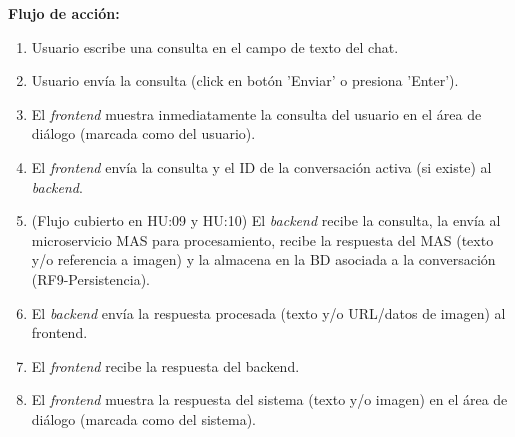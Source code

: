 \begin{userstory}[hu:08]
{		\textbf{Flujo de acción:}
		\begin{enumerate}
			\item Usuario escribe una consulta en el campo de texto del chat.
			\item Usuario envía la consulta (click en botón 'Enviar' o presiona 'Enter').
			\item El \textit{frontend} muestra inmediatamente la consulta del usuario en el área de diálogo (marcada como del usuario).
			\item El \textit{frontend} envía la consulta y el ID de la conversación activa (si existe) al \textit{backend}.
			\item (Flujo cubierto en HU:09 y HU:10) El \textit{backend} recibe la consulta, la envía al microservicio MAS para procesamiento, recibe la respuesta del MAS (texto y/o referencia a imagen) y la almacena en la BD asociada a la conversación (RF9-Persistencia).
			\item El \textit{backend} envía la respuesta procesada (texto y/o URL/datos de imagen) al frontend.
			\item El \textit{frontend} recibe la respuesta del backend.
			\item El \textit{frontend} muestra la respuesta del sistema (texto y/o imagen) en el área de diálogo (marcada como del sistema).
		\end{enumerate}
	}
	
\end{userstory}

